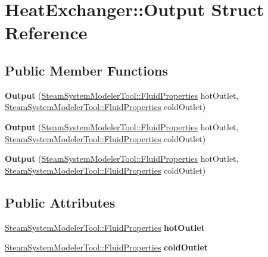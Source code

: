 \hypertarget{struct_heat_exchanger_1_1_output}{}\section{Heat\+Exchanger\+:\+:Output Struct Reference}
\label{struct_heat_exchanger_1_1_output}
\subsection*{Public Member Functions}
\begin{DoxyCompactItemize}
\item 
\mbox{\label{struct_heat_exchanger_1_1_output_aeb73d441f9a6f13839ec02d7f6d1f30f}} 
{\bfseries Output} (\hyperlink{struct_steam_system_modeler_tool_1_1_fluid_properties}{Steam\+System\+Modeler\+Tool\+::\+Fluid\+Properties} hot\+Outlet, \hyperlink{struct_steam_system_modeler_tool_1_1_fluid_properties}{Steam\+System\+Modeler\+Tool\+::\+Fluid\+Properties} cold\+Outlet)
\item 
\mbox{\label{struct_heat_exchanger_1_1_output_aeb73d441f9a6f13839ec02d7f6d1f30f}} 
{\bfseries Output} (\hyperlink{struct_steam_system_modeler_tool_1_1_fluid_properties}{Steam\+System\+Modeler\+Tool\+::\+Fluid\+Properties} hot\+Outlet, \hyperlink{struct_steam_system_modeler_tool_1_1_fluid_properties}{Steam\+System\+Modeler\+Tool\+::\+Fluid\+Properties} cold\+Outlet)
\item 
\mbox{\label{struct_heat_exchanger_1_1_output_aeb73d441f9a6f13839ec02d7f6d1f30f}} 
{\bfseries Output} (\hyperlink{struct_steam_system_modeler_tool_1_1_fluid_properties}{Steam\+System\+Modeler\+Tool\+::\+Fluid\+Properties} hot\+Outlet, \hyperlink{struct_steam_system_modeler_tool_1_1_fluid_properties}{Steam\+System\+Modeler\+Tool\+::\+Fluid\+Properties} cold\+Outlet)
\end{DoxyCompactItemize}
\subsection*{Public Attributes}
\begin{DoxyCompactItemize}
\item 
\mbox{\label{struct_heat_exchanger_1_1_output_a6b4e7a81d54aa209a1507818e654c3c6}} 
\hyperlink{struct_steam_system_modeler_tool_1_1_fluid_properties}{Steam\+System\+Modeler\+Tool\+::\+Fluid\+Properties} {\bfseries hot\+Outlet}
\item 
\mbox{\label{struct_heat_exchanger_1_1_output_a0c0bed7c2c3d99ee8c49d6c19f7789e8}} 
\hyperlink{struct_steam_system_modeler_tool_1_1_fluid_properties}{Steam\+System\+Modeler\+Tool\+::\+Fluid\+Properties} {\bfseries cold\+Outlet}
\end{DoxyCompactItemize}


